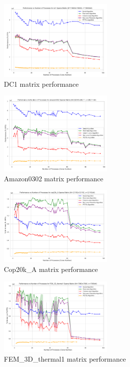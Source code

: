 \documentclass[12pt,oneside]{book} %
\begin{document}
\begin{figure}[H]
    \centering
    \includegraphics[width=0.5\textwidth]{../results/matrix_dim/dc1_k6_performance.png}
    \caption{DC1 matrix performance}\label{fig:dc1-k6-performance}
\end{figure}

\begin{figure}[H]
    \centering
    \includegraphics[width=0.5\textwidth]{../results/matrix_dim/amazon0302_k6_performance.png}
    \caption{Amazon0302 matrix performance}\label{fig:amazon0302-k6-performance}
\end{figure}

\begin{figure}[H]
    \centering
    \includegraphics[width=0.5\textwidth]{../results/matrix_dim/cop20k_A_k6_performance.png}
    \caption{Cop20k\_A matrix performance}\label{fig:cop20k-a-k6-performance-1}
\end{figure}

\begin{figure}[H]
    \centering
    \includegraphics[width=0.5\textwidth]{../results/matrix_dim/FEM_3D_thermal1_k6_performance.png}
    \caption{FEM\_3D\_thermal1 matrix performance}\label{fig:fem-3d-thermal1-k6-performance}
\end{figure}
\end{document}
